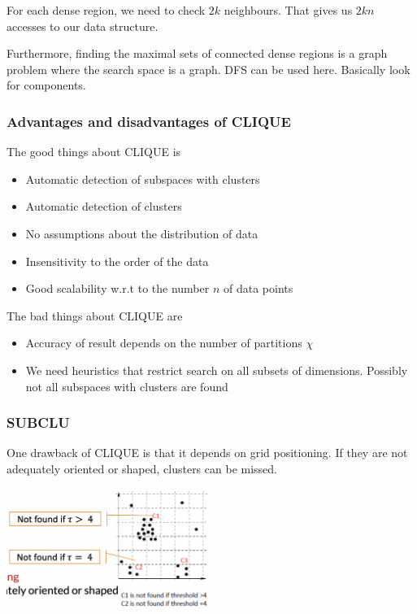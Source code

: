     For each dense region, we need to check $2k$ neighbours. That gives us $2kn$ accesses to our data structure. 
    
    Furthermore, finding the maximal sets of connected dense regions is a graph problem where the search space is a graph. DFS can be used here. Basically look for components.
    
\subsubsection{Advantages and disadvantages of CLIQUE}
    The good things about CLIQUE is
    \begin{itemize}
        \item Automatic detection of subspaces with clusters
        \item Automatic detection of clusters
        \item No assumptions about the distribution of data
        \item Insensitivity to the order of the data
        \item Good scalability w.r.t to the number $n$ of data points
    \end{itemize}
    The bad things about CLIQUE are
    \begin{itemize}
        \item Accuracy of result depends on the number of partitions $\chi$
        \item We need heuristics that restrict search on all subsets of dimensions. Possibly not all subspaces with clusters are found
    \end{itemize}
    
\subsubsection{SUBCLU} 
One drawback of CLIQUE is that it depends on grid positioning. If they are not adequately oriented or shaped, clusters can be missed.

\begin{center}
    \includegraphics[width=0.5\textwidth]{images/notfound.png}
\end{center}

